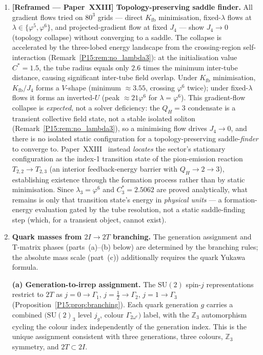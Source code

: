 \documentclass[11pt,a4paper]{article}
\theoremstyle{definition}\newtheorem{definition}[theorem]{Definition}
\theoremstyle{remark}
\newcommand{\vp}{\varphi}
\newcommand{\lam}{\lambda}
\newcommand{\Kfb}{K_{\mathrm{fb}}}
\newcommand{\twoI}{2I}
\newcommand{\twoT}{2T}
\newcommand{\QH}{Q_H}
\begin{document}
\begin{enumerate}[noitemsep,label=(\roman*)]
\item \textbf{[Reframed --- Paper~XXIII] Topology-preserving saddle finder.}
  All gradient flows tried on $80^3$ grids --- direct $\Kfb$
  minimisation, fixed-$\lam$ flows at $\lam\in\{\vp^5,\vp^6\}$,
  and projected-gradient flow at fixed $J_4$ --- show $J_4\to 0$
  (topology collapse) without converging to a saddle.
  The collapse is accelerated by the three-lobed energy landscape
  from the crossing-region self-interaction
  (Remark~\ref{P15:rem:no_lambda3}): at the initialisation value
  $C^*=1.5$, the tube radius equals only $2.6$ times the minimum
  inter-tube distance, causing significant inter-tube field overlap.
  Under $\Kfb$ minimisation, $\Kfb/J_4$ forms a $V$-shape (minimum
  $\approx 3.55$, crossing $\vp^6$ twice); under fixed-$\lam$ flows
  it forms an inverted-$U$ (peak $\approx 21\vp^6$ for $\lam=\vp^6$).
  This gradient-flow collapse is \emph{expected}, not a solver
  deficiency: the $\QH=3$ condensate is a transient collective field
  state, not a stable isolated soliton (Remark~\ref{P15:rem:no_lambda3}),
  so a minimising flow drives $J_4\to0$, and there is no isolated static
  configuration for a topology-preserving saddle-\emph{finder} to
  converge to. Paper~XXIII~\cite{Paper23} instead \emph{locates} the
  sector's stationary configuration as the index-1 transition state of
  the pion-emission reaction $T_{2,2}\!\to\!T_{2,3}$ (an interior
  feedback-energy barrier with $\QH\!\to\!2\!\to\!3$), establishing
  existence through the formation process rather than by static
  minimisation. Since $\lam_3=\vp^6$ and $C_3^*=2.5062$ are proved
  analytically, what remains is only that transition state's energy in
  \emph{physical units} --- a formation-energy evaluation gated by the
  tube resolution, not a static saddle-finding step (which, for a
  transient object, cannot exist).

\item \textbf{Quark masses from $\twoI\to\twoT$ branching.}
  The generation assignment and T-matrix phases (parts~(a)--(b) below)
  are determined by the branching rules; the absolute mass scale
  (part~(c)) additionally requires the quark Yukawa formula.

  \textbf{(a) Generation-to-irrep assignment.}
  The $\mathrm{SU}(2)$ spin-$j$ representations restrict to $\twoT$ as
  $j=0\to\Gamma_1$, $j=\tfrac12\to\Gamma_2$, $j=1\to\Gamma_3$
  (Proposition~\ref{P15:prop:branching}).
  Each quark generation $g$ carries a combined $(\mathrm{SU}(2)_3$
  level $j_g$, colour $\Gamma_{2\omega^c})$ label, with the
  $\mathbb{Z}_3$ automorphism cycling the colour index independently of
  the generation index. This is the unique assignment consistent with
  three generations, three colours, $\mathbb{Z}_3$ symmetry,
  and $\twoT\subset\twoI$.


\end{enumerate}
\end{document}
